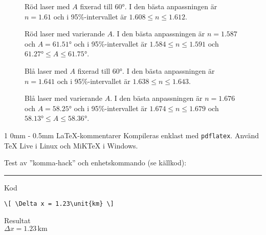 \documentclass[a4paper]{article}
\makeatletter
\newcommand{\unit}[1]{\ensuremath{\,\mathrm{#1}}}
\renewcommand{\section}{\@startsection
{section}%
{1}%
{0mm}%
{-\baselineskip}%
{0.5mm}%
{\normalfont\bfseries}} %
\makeatother
\begin{document}
\begin{figure}[h]
	\centering
	
	\caption{Röd laser med $A$ fixerad till $60°$. I den bästa anpassningen är $n=1.61$ och i 95\%-intervallet är $1.608\le n \le1.612$.}
	\label{fig:red60}
\end{figure}
\begin{figure}[h]
	\centering
	
	\caption{Röd laser med varierande $A$. I den bästa anpassningen är $n=1.587$ och $A=61.51°$ och i 95\%-intervallet är $1.584\le n \le1.591$ och $61.27°\le A \le61.75°$.}
	\label{fig:red}
\end{figure}
\begin{figure}[h]
	\centering
	
	\caption{Blå laser med $A$ fixerad till $60°$. I den bästa anpassningen är $n=1.641$ och i 95\%-intervallet är $1.638\le n \le1.643$.}
	\label{fig:blue60}
\end{figure}
\begin{figure}[h]
	\centering
	
	\caption{Blå laser med varierande $A$. I den bästa anpassningen är $n=1.676$ och $A=58.25°$ och i 95\%-intervallet är $1.674\le n \le1.679$ och $58.13°\le A \le58.36°$.}
	\label{fig:blue}
\end{figure}

\section{\LaTeX-kommentarer}
Kompileras enklast med \texttt{pdflatex}. Använd TeX Live i Linux och
MiKTeX i Windows.

Test av ”komma-hack” och enhetskommando (se källkod):
\hrule
\begin{minipage}{0.5\linewidth}
  Kod
\begin{verbatim}
\[ \Delta x = 1.23\unit{km} \]
\end{verbatim}
\end{minipage}
\begin{minipage}{0.5\linewidth}
  Resultat\\
  $ \Delta x = 1.23\unit{km} $
\end{minipage}
\end{document}
